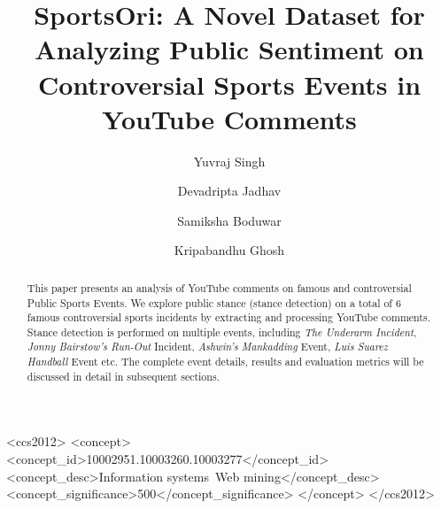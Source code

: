 \documentclass[sigconf, review]{acmart}
\begin{document}

\title{SportsOri: A Novel Dataset for Analyzing Public Sentiment on Controversial Sports Events in YouTube Comments}




\author{Yuvraj Singh}


\author{Devadripta Jadhav}

\author{Samiksha Boduwar}




\author{Kripabandhu Ghosh}
\renewcommand{\shortauthors}{Singh et al.}

\begin{abstract}
  This paper presents an analysis of YouTube comments on famous and controversial Public Sports Events. We explore public stance (stance detection) on a total of 6 famous controversial sports incidents by extracting and processing YouTube comments. Stance detection is performed on multiple events, including \textit{The Underarm Incident}, \textit{Jonny Bairstow's Run-Out} Incident, \textit{Ashwin's Mankadding} Event, \textit{Luis Suarez Handball} Event etc. 
The complete event details,  results and evaluation metrics will be discussed in detail in subsequent sections.
\end{abstract}


\begin{CCSXML}
<ccs2012>
   <concept>
       <concept_id>10002951.10003260.10003277</concept_id>
       <concept_desc>Information systems~Web mining</concept_desc>
       <concept_significance>500</concept_significance>
       </concept>
 </ccs2012>
\end{CCSXML}
\end{document}
